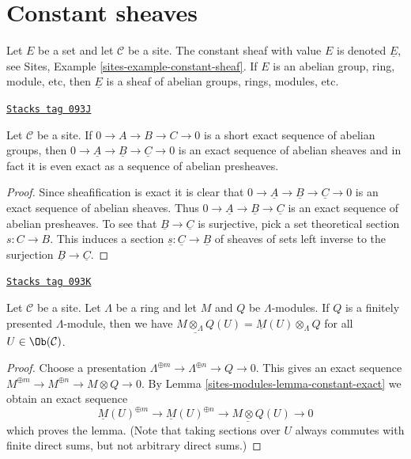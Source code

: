 \section{Constant sheaves}
\label{sites-modules-section-constant}
Let $E$ be a set and let $\mathcal{C}$ be a site. The constant
sheaf with value $E$ is denoted $\underline{E}$, see
Sites, Example \ref{sites-example-constant-sheaf}.
If $E$ is an abelian group, ring, module, etc,
then $\underline{E}$ is a sheaf of abelian groups, rings, modules, etc.

\begin{lemma}
\label{sites-modules-lemma-constant-exact}
\href{https://stacks.math.columbia.edu/tag/093J}{\texttt{Stacks tag 093J}}

Let $\mathcal{C}$ be a site. If $0 \to A \to B \to C \to 0$
is a short exact sequence of abelian groups, then
$0 \to \underline{A} \to \underline{B} \to \underline{C} \to 0$
is an exact sequence of abelian sheaves and in fact it is even
exact as a sequence of abelian presheaves.
\end{lemma}

\begin{proof}
Since sheafification is exact it is clear that
$0 \to \underline{A} \to \underline{B} \to \underline{C} \to 0$
is an exact sequence of abelian sheaves. Thus
$0 \to \underline{A} \to \underline{B} \to \underline{C}$
is an exact sequence of abelian presheaves. To see that
$\underline{B} \to \underline{C}$ is surjective, pick a
set theoretical section $s : C \to B$. This induces a
section $\underline{s} : \underline{C} \to \underline{B}$
of sheaves of sets left inverse to the surjection
$\underline{B} \to \underline{C}$.
\end{proof}

\begin{lemma}
\label{sites-modules-lemma-tensor-with-finitely-presented}
\href{https://stacks.math.columbia.edu/tag/093K}{\texttt{Stacks tag 093K}}

Let $\mathcal{C}$ be a site. Let $\Lambda$ be a ring and let $M$
and $Q$ be $\Lambda$-modules. If $Q$ is a finitely presented
$\Lambda$-module, then we have
$\underline{M \otimes_\Lambda Q}(U) = \underline{M}(U) \otimes_\Lambda Q$
for all $U \in \Ob(\mathcal{C})$.
\end{lemma}

\begin{proof}
Choose a presentation $\Lambda^{\oplus m} \to \Lambda^{\oplus n} \to Q \to 0$.
This gives an exact sequence
$M^{\oplus m} \to M^{\oplus n} \to M \otimes Q \to 0$.
By Lemma \ref{sites-modules-lemma-constant-exact} we obtain an exact sequence
$$
\underline{M}(U)^{\oplus m} \to
\underline{M}(U)^{\oplus n} \to
\underline{M \otimes Q}(U) \to 0
$$
which proves the lemma. (Note that taking sections over $U$ always
commutes with finite direct sums, but not arbitrary direct sums.)
\end{proof}

